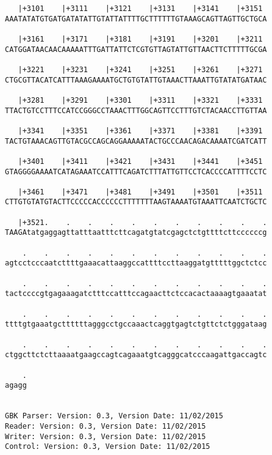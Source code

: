 \documentclass{article}
\begin{document}
\begin{Verbatim}
   |+3101    |+3111    |+3121    |+3131    |+3141    |+3151 
AAATATATGTGATGATATATTGTATTATTTTGCTTTTTTGTAAAGCAGTTAGTTGCTGCA
                                                            
   |+3161    |+3171    |+3181    |+3191    |+3201    |+3211 
CATGGATAACAACAAAAATTTGATTATTCTCGTGTTAGTATTGTTAACTTCTTTTTGCGA
                                                            
   |+3221    |+3231    |+3241    |+3251    |+3261    |+3271 
CTGCGTTACATCATTTAAAGAAAATGCTGTGTATTGTAAACTTAAATTGTATATGATAAC
                                                            
   |+3281    |+3291    |+3301    |+3311    |+3321    |+3331 
TTACTGTCCTTTCCATCCGGGCCTAAACTTTGGCAGTTCCTTTGTCTACAACCTTGTTAA
                                                            
   |+3341    |+3351    |+3361    |+3371    |+3381    |+3391 
TACTGTAAACAGTTGTACGCCAGCAGGAAAAATACTGCCCAACAGACAAAATCGATCATT
                                                            
   |+3401    |+3411    |+3421    |+3431    |+3441    |+3451 
GTAGGGGAAAATCATAGAAATCCATTTCAGATCTTTATTGTTCCTCACCCCATTTTCCTC
                                                            
   |+3461    |+3471    |+3481    |+3491    |+3501    |+3511 
CTTGTGTATGTACTTCCCCCACCCCCCTTTTTTTAAGTAAAATGTAAATTCAATCTGCTC
                                                            
   |+3521.    .    .    .    .    .    .    .    .    .    .
TAAGAtatgaggagttatttaatttcttcagatgtatcgagctctgttttcttccccccg
                                                            
    .    .    .    .    .    .    .    .    .    .    .    .
agtcctcccaatcttttgaaacattaaggccattttccttaaggatgtttttggctctcc
                                                            
    .    .    .    .    .    .    .    .    .    .    .    .
tactccccgtgagaaagatctttccatttccagaacttctccacactaaaagtgaaatat
                                                            
    .    .    .    .    .    .    .    .    .    .    .    .
ttttgtgaaatgcttttttagggcctgccaaactcaggtgagtctgttctctgggataag
                                                            
    .    .    .    .    .    .    .    .    .    .    .    .
ctggcttctcttaaaatgaagccagtcagaaatgtcagggcatcccaagattgaccagtc
                                                            
    .
agagg
     
     
GBK Parser: Version: 0.3, Version Date: 11/02/2015
Reader: Version: 0.3, Version Date: 11/02/2015
Writer: Version: 0.3, Version Date: 11/02/2015
Control: Version: 0.3, Version Date: 11/02/2015
\end{Verbatim}
\end{document}
